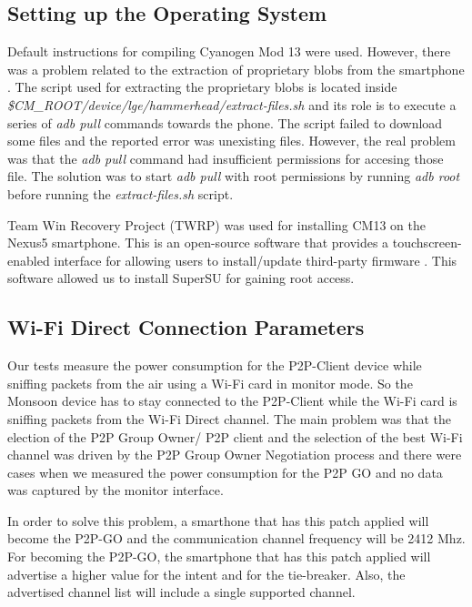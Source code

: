\subsection{Setting up the Operating System}
\label{sub-sec:proj-scopenexus5operatingsystem}

Default instructions \cite{cite-compilingcm13} for compiling Cyanogen Mod 13 were used. However, there was a problem related to the extraction of proprietary blobs from the smartphone \cite{cite-proprietaryblobs}. The script used for extracting the proprietary blobs is located inside \textit{\$CM_ROOT/device/lge/hammerhead/extract-files.sh} and its role is to execute a series of \textit{adb pull} commands towards the phone. The script failed to download some files and the reported error was unexisting files. However, the real problem was that the \textit{adb pull} command had insufficient permissions for accesing those file. The solution was to start \textit{adb pull} with root permissions by running \textit{adb root} before running the \textit{extract-files.sh} script.

Team Win Recovery Project (TWRP) was used for installing CM13 on the Nexus5 smartphone. This is an open-source software that provides a touchscreen-enabled interface for allowing users to install/update third-party firmware \cite{cite-twrp}. This software allowed us to install SuperSU for gaining root access.

\subsection{Wi-Fi Direct Connection Parameters}
\label{sub-sec:proj-scopep2pconnectionsectup}

Our tests measure the power consumption for the P2P-Client device while sniffing packets from the air using a Wi-Fi card in monitor mode. So the Monsoon device has to stay connected to the P2P-Client while the Wi-Fi card is sniffing packets from the Wi-Fi Direct channel. The main problem was that the election of the P2P Group Owner/ P2P client and the selection of the best Wi-Fi channel was driven by the P2P Group Owner Negotiation process and there were cases when we measured the power consumption for the P2P GO and no data was captured by the monitor interface.

In order to solve this problem, a smarthone that has this patch \cite{cite-p2ppatch} applied will become the P2P-GO and the communication channel frequency will be 2412 Mhz. For becoming the P2P-GO, the smartphone that has this patch applied will advertise a higher value for the intent and for the tie-breaker. Also, the advertised channel list will include a single supported channel.

